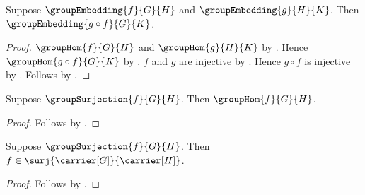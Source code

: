 \begin{theorem}\label{group_embedding_composition}
    Suppose $\groupEmbedding{f}{G}{H}$ and
        $\groupEmbedding{g}{H}{K}$.
    Then $\groupEmbedding{g\circ f}{G}{K}$.
\end{theorem}
\begin{proof}
    $\groupHom{f}{G}{H}$ and $\groupHom{g}{H}{K}$ by
        .
    Hence $\groupHom{g\circ f}{G}{K}$ by
        .
    $f$ and $g$ are injective by
        .
    Hence $g\circ f$ is injective by .
    Follows by .
\end{proof}

\begin{proposition}\label{group_surjection_is_hom}
    Suppose $\groupSurjection{f}{G}{H}$.
    Then $\groupHom{f}{G}{H}$.
\end{proposition}
\begin{proof}
    Follows by .
\end{proof}

\begin{proposition}\label{group_surjection_is_surj}
    Suppose $\groupSurjection{f}{G}{H}$.
    Then $f\in\surj{\carrier[G]}{\carrier[H]}$.
\end{proposition}
\begin{proof}
    Follows by .
\end{proof}

